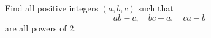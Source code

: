 \ifshowproblem
\begin{problem}\label{example:IMO-2015-P2}
    Find all positive integers $(a,b,c)$ such that
$$ab-c,\quad bc-a,\quad ca-b$$are all powers of $2$.
\end{problem}
\fi

\footnotemark
{}
\fi
